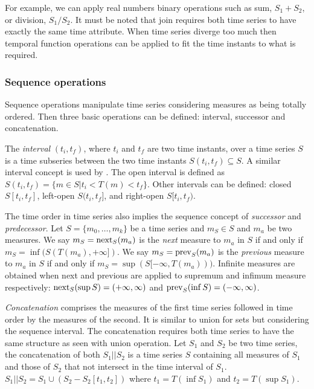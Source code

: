 For example, we can apply real numbers binary operations such as sum,
$S_1 + S_2$, or division, $S_1 / S_2$. It must be noted that join
requires both time series to have exactly the same time
attribute. When time series diverge too much then temporal function
operations can be applied to fit the time instants to what is
required.





\subsubsection{Sequence operations}

Sequence operations manipulate time series considering measures as
being totally ordered. Then three basic operations can be defined:
interval, successor and concatenation.


The \emph{interval} $(t_i,t_f)$, where $t_i$ and $t_f$ are two time
instants, over a time series $S$ is a time subseries between the two
time instants $S(t_i,t_f) \subseteq S$. A similar interval concept
is used by \cite{last:hetland}. The open interval is defined as
$S(t_i,t_f)=\{m\in S | t_i<T(m)<t_f\}$. Other intervals can be
defined: closed $S[t_i,t_f]$, left-open $S(t_i,t_f]$, and right-open
$S[t_i,t_f)$.

The time order in time series also implies the sequence concept of
\emph{successor} and \emph{predecessor}.  Let $S=\{m_0, \ldots, m_k\}$
be a time series and $m_S\in S$ and $m_a$ be two measures. We say
$m_S=\operatorname*{next}_S(m_a)$ is the \emph{next} measure to $m_a$ in $S$ if and
only if $m_S=\inf(S(T(m_a),+\infty])$.  We say $m_S=\operatorname*{prev}_S(m_a)$ is
the \emph{previous} measure to $m_a$ in $S$ if and only if
$m_S=\sup(S[-\infty,T(m_a)))$. %
Infinite measures are obtained when next and previous are applied to
supremum and infimum measure respectively: $\operatorname*{next}_S(\sup
S)=(+\infty,\infty)$ and $\operatorname*{prev}_S(\inf S)=(-\infty,\infty)$.



\emph{Concatenation} comprises the measures of the first time series
followed in time order by the measures of the second. It is similar to
union for sets but considering the sequence interval. The
concatenation requires both time series to have the same structure as
seen with union operation.  Let $S_1$ and $S_2$ be two time series,
the concatenation of both $S_1 || S_2$ is a time series $S$ containing
all measures of $S_1$ and those of $S_2$ that not intersect in the
time interval of $S_1$.  $S_1 || S_2 = S_1 \cup ( S_2 - S_2[t_1,t_2]
)$ where $t_1=T(\inf S_1)$ and $t_2=T(\sup S_1)$.



